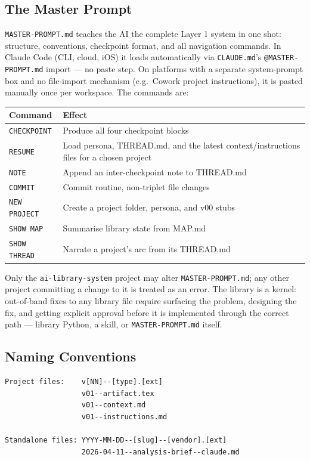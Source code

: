\documentclass[12pt,letterpaper]{article}
\begin{document}
\subsection{The Master Prompt}

\texttt{MASTER-PROMPT.md} teaches the AI the complete Layer 1 system in
one shot: structure, conventions, checkpoint format, and all navigation
commands. In Claude Code (CLI, cloud, iOS) it loads automatically via
\texttt{CLAUDE.md}'s \texttt{@MASTER-PROMPT.md} import --- no paste step.
On platforms with a separate system-prompt box and no file-import
mechanism (e.g.\ Cowork project instructions), it is pasted manually
once per workspace. The commands are:

\begin{center}
\begin{tabular}{@{}ll@{}}
\toprule
\textbf{Command} & \textbf{Effect} \\
\midrule
\texttt{CHECKPOINT} & Produce all four checkpoint blocks \\
\texttt{RESUME} & Load persona, THREAD.md, and the latest
context/instructions files for a chosen project \\
\texttt{NOTE} & Append an inter-checkpoint note to THREAD.md \\
\texttt{COMMIT} & Commit routine, non-triplet file changes \\
\texttt{NEW PROJECT} & Create a project folder, persona, and v00 stubs \\
\texttt{SHOW MAP} & Summarise library state from MAP.md \\
\texttt{SHOW THREAD} & Narrate a project's arc from its THREAD.md \\
\bottomrule
\end{tabular}
\end{center}

Only the \texttt{ai-library-system} project may alter
\texttt{MASTER-PROMPT.md}; any other project committing a change to it
is treated as an error. The library is a kernel: out-of-band fixes to
any library file require surfacing the problem, designing the fix, and
getting explicit approval before it is implemented through the correct
path --- library Python, a skill, or \texttt{MASTER-PROMPT.md} itself.

\subsection{Naming Conventions}

\begin{lstlisting}
Project files:    v[NN]--[type].[ext]
                  v01--artifact.tex
                  v01--context.md
                  v01--instructions.md

Standalone files: YYYY-MM-DD--[slug]--[vendor].[ext]
                  2026-04-11--analysis-brief--claude.md
\end{lstlisting}
\end{document}
